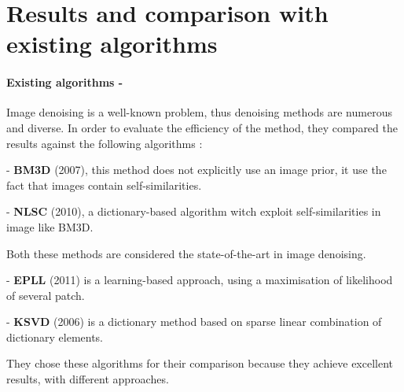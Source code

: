 \documentclass[10pt,a4paper]{article}
\newcommand{\svs}{\vspace{9pt}}
\newcommand{\ourparagraph}[1]{\paragraph{#1}}
\begin{document}

\svs

\section{Results and comparison with existing algorithms}



\ourparagraph{Existing algorithms -}{

Image denoising is a well-known problem, thus denoising methods are numerous and diverse. In order to evaluate the efficiency of the method, they compared the results against the following algorithms :

\svs
- \textbf{BM3D} (2007), this method does not explicitly use an image prior, it use the fact that images contain self-similarities.

- \textbf{NLSC} (2010), a dictionary-based algorithm witch exploit self-similarities in image like BM3D.

Both these methods are considered the state-of-the-art in image denoising.

- \textbf{EPLL} (2011) is a learning-based approach, using a maximisation of likelihood of several patch.

- \textbf{KSVD} (2006) is a dictionary method based on sparse linear combination of dictionary elements.
\svs

They chose these algorithms for their comparison because they achieve excellent results, with different approaches.}
\end{document}

